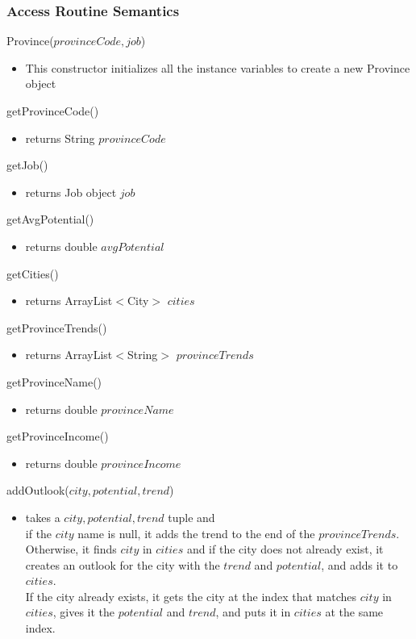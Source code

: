 \documentclass[12pt,fleqn]{article}
\begin{document}
\subsubsection*{Access Routine Semantics}
\noindent Province($provinceCode, job$)
\begin{itemize}
\item This constructor initializes all the instance variables to create a new Province object
\end{itemize}
\noindent getProvinceCode()
\begin{itemize}
\item returns  String $provinceCode$
\end{itemize}
\noindent getJob()
\begin{itemize}
\item returns Job object $job$
\end{itemize}
\noindent getAvgPotential()
\begin{itemize}
\item returns double $avgPotential$
\end{itemize}
\noindent getCities()
\begin{itemize}
\item returns ArrayList$<$City$>$ $cities$
\end{itemize}
\noindent getProvinceTrends()
\begin{itemize}
\item returns ArrayList$<$String$>$ $provinceTrends$
\end{itemize}
\noindent getProvinceName()
\begin{itemize}
\item returns double $provinceName$
\end{itemize}
\noindent getProvinceIncome()
\begin{itemize}
\item returns double $provinceIncome$
\end{itemize}
\noindent addOutlook($city, potential, trend$)
\begin{itemize}
\item takes a $city, potential, trend$ tuple and 
\\if the $city$ name is null, it adds the trend to the end of the $provinceTrends$.
\\Otherwise, it finds $city$ in $cities$ and if the city does not already exist, it creates an outlook for the city with the $trend$ and $potential$, and adds it to $cities$. 
\\If the city already exists, it gets the city at the index that matches $city$ in $cities$, gives it the $potential$ and $trend$, and puts it in $cities$ at the same index.
\end{itemize}
\end{document}
